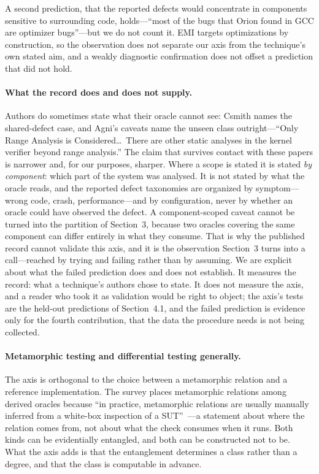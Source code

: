 A second prediction, that the reported defects would concentrate in components
sensitive to surrounding code, holds---``most of the bugs that Orion found in GCC are
optimizer bugs''---but we do not count it. EMI targets optimizations by construction,
so the observation does not separate our axis from the technique's own stated aim, and
a weakly diagnostic confirmation does not offset a prediction that did not hold.

\paragraph{What the record does and does not supply.}
Authors do sometimes state what their oracle cannot see: Csmith names the shared-defect
case, and Agni's caveats name the unseen class outright---``Only Range Analysis is
Considered\ldots\ There are other static analyses in the kernel verifier beyond range
analysis.'' The claim that survives contact with these papers is narrower and, for our
purposes, sharper. Where a scope is stated it is stated \emph{by component}: which part
of the system was analysed. It is not stated by what the oracle reads, and the reported
defect taxonomies are organized by symptom---wrong code, crash, performance---and by
configuration, never by whether an oracle could have observed the defect. A
component-scoped caveat cannot be turned into the partition of Section~3, because two
oracles covering the same component can differ entirely in what they consume. That is
why the published record cannot validate this axis, and it is the observation
Section~3 turns into a call---reached by trying and failing rather than by assuming.
We are explicit about what the failed prediction does and does not establish. It
measures the record: what a technique's authors chose to state. It does not measure
the axis, and a reader who took it as validation would be right to object; the
axis's tests are the held-out predictions of Section~4.1, and the failed prediction
is evidence only for the fourth contribution, that the data the procedure needs is
not being collected.

\paragraph{Metamorphic testing and differential testing generally.}
The axis is orthogonal to the choice between a metamorphic relation and a reference
implementation. The survey places metamorphic relations among derived oracles because
``in practice, metamorphic relations are usually manually inferred from a white-box
inspection of a SUT''~\cite{barr2015oracle}---a statement about where the relation
comes from, not about what the check consumes when it runs. Both kinds can be
evidentially entangled, and both can be constructed not to be. What the axis adds is
that the entanglement determines a class rather than a degree, and that the class is
computable in advance.
